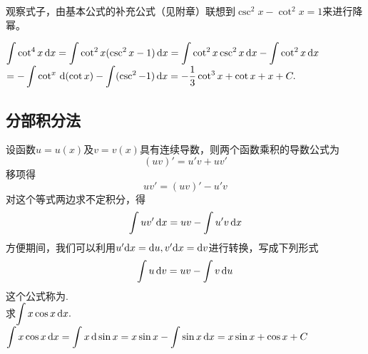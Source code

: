 \solvereason 观察式子，由基本公式的补充公式（见附章）联想到$\csc^2 x-\cot^2 x=1$来进行降幂。

\solve 
$	\displaystyle\int \cot^4 x \,{\rm{d}} x=\int \cot ^2 x(\csc^2 x-1) \,{\rm{d}} x=\int \cot^2 x\csc^2 x \,{\rm{d}} x-\int \cot^2 x \,{\rm{d}} x$\\
\hspace*{9.8em}$\displaystyle	=-\int\cot^x \,{\rm{d}}(\cot x)-\int(\csc^2-1) \,{\rm{d}} x=-\frac{1}{3}\cot^3 x+\cot x+x+C.$
\vspace*{0.5em}

\subsection{分部积分法}
	设函数$u=u(x)$及$v=v(x)$具有连续导数，则两个函数乘积的导数公式为
	\begin{equation}
		(uv)'=u'v+uv'
	\end{equation} 
移项得
\begin{equation}
	uv'=(uv)'-u'v
	\end{equation}
对这个等式两边求不定积分，得
\begin{equation}
	\int uv' \,{\rm{d}} x=uv-\int u'v \,{\rm{d}} x
\end{equation}
方便期间，我们可以利用$u'{\rm{d}} x={\rm{d}} u,v'{\rm{d}} x={\rm{d}} v$进行转换，写成下列形式
\begin{equation}
	\int u \,{\rm{d}} v=uv-\int v \,{\rm{d}} u
\end{equation}
这个公式称为.\\
\vspace{1em}
\examples 求$\displaystyle\int x\cos x \,{\rm{d}} x.$\\
\solve $\displaystyle\int x\cos x \,{\rm{d}} x=\int x \,{\rm{d}} \sin x=x\sin x-\int \sin x \,{\rm{d}} x=x\sin x+\cos x+C $




